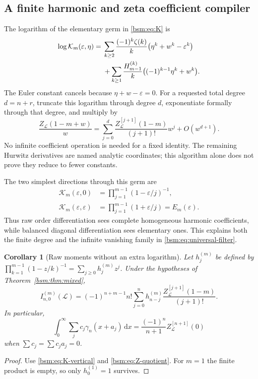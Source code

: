 \documentclass[11pt,letterpaper]{article}
\numberwithin{equation}{section}
\newtheorem{corollary}[theorem]{Corollary}
\theoremstyle{definition}\newtheorem{definition}[theorem]{Definition}
\theoremstyle{remark}\newtheorem{remark}[theorem]{Remark}
\newcommand{\dd}{\,\mathrm{d}}
\newcommand{\Lcal}{\mathcal L}
\newcommand{\Kcal}{\mathcal K}
\newcommand{\eps}{\varepsilon}
\begin{document}
\subsection{A finite harmonic and zeta coefficient compiler}
The logarithm of the elementary germ in \eqref{bsm:eq:K} is
\begin{align}\label{bsm:eq:K-log}
 \log\Kcal_m(\eps,\eta)
 ={}&\sum_{k\ge2}\frac{(-1)^k\zeta(k)}k
              \bigl(\eta^k+w^k-\eps^k\bigr)\notag\\
 &+\sum_{k\ge1}\frac{H_{m-1}^{(k)}}k
              \bigl((-1)^{k-1}\eta^k+w^k\bigr).
\end{align}
The Euler constant cancels because $\eta+w-\eps=0$.
For a requested total degree $d=n+r$, truncate this logarithm through
degree $d$, exponentiate formally through that degree, and multiply by
\begin{equation}\label{bsm:eq:Z-quotient}
 \frac{Z_{\Lcal}(1-m+w)}w
   =\sum_{j=0}^{d}\frac{Z_{\Lcal}^{[j+1]}(1-m)}{(j+1)!}w^j
                                      +O(w^{d+1}).
\end{equation}
No infinite coefficient operation is needed for a fixed identity.
The remaining Hurwitz derivatives are named analytic coordinates;
this algorithm alone does not prove they reduce to fewer constants.

The two simplest directions through this germ are
\begin{align}
 \Kcal_m(\eps,0)&=\prod_{j=1}^{m-1}(1-\eps/j)^{-1},
 \label{bsm:eq:K-vertical}\\
 \Kcal_m(\eps,\eps)&=\prod_{j=1}^{m-1}(1+\eps/j)=E_m(\eps).
 \label{bsm:eq:K-diagonal}
\end{align}
Thus raw order differentiation sees complete homogeneous harmonic
coefficients, while balanced diagonal differentiation sees elementary
ones. This explains both the finite degree and the infinite vanishing
family in \eqref{bsm:eq:universal-filter}.

\begin{corollary}[Raw moments without an extra logarithm]\label{bsm:cor:raw}
Let $h_j^{(m)}$ be defined by
$\prod_{k=1}^{m-1}(1-z/k)^{-1}=\sum_{j\ge0}h_j^{(m)}z^j$.
Under the hypotheses of Theorem~\ref{bsm:thm:mixed},
\begin{equation}\label{bsm:eq:raw-only}
 I_{n,0}^{(m)}(\Lcal)=(-1)^{n+m-1}n!
       \sum_{j=0}^{n}h_{n-j}^{(m)}
            \frac{Z_{\Lcal}^{[j+1]}(1-m)}{(j+1)!}.
\end{equation}
In particular,
\begin{equation}\label{bsm:eq:raw-m1}
 \int_0^\infty\sum_jc_j\gamma_n(x+a_j)\dd x
       =\frac{(-1)^n}{n+1}Z_{\Lcal}^{[n+1]}(0)
\end{equation}
when $\sum c_j=\sum c_ja_j=0$.
\end{corollary}
\begin{proof}
Use \eqref{bsm:eq:K-vertical} and \eqref{bsm:eq:Z-quotient}. For $m=1$ the
finite product is empty, so only $h_0^{(1)}=1$ survives.
\end{proof}
\end{document}
